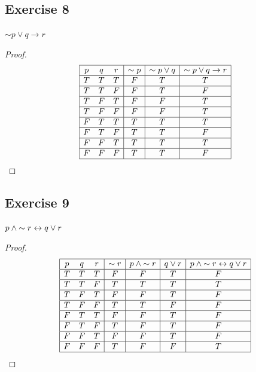 \documentclass[14pt]{extarticle}
\begin{document}
\subsection{Exercise 8} ${\sim p} \vee q \to r$
\begin{proof} $$ \begin{array}{|ccc|c|c|c|} \hline p & q & r & {\sim p} & {\sim
p} \vee q & {\sim p} \vee q \to r \\ \hline T & T & T & F & T & T \\ \hline T &
T & F & F & T & F \\ \hline T & F & T & F & F & T \\ \hline T & F & F & F & F &
T \\ \hline F & T & T & T & T & T \\ \hline F & T & F & T & T & F \\ \hline F &
F & T & T & T & T \\ \hline F & F & F & T & T & F \\ \hline \end{array} $$
\end{proof}

\subsection{Exercise 9} $p \wedge {\sim r} \leftrightarrow q \vee r$
\begin{proof} $$ \begin{array}{|ccc|c|c|c|c|} \hline p & q & r & {\sim r} & p
\wedge {\sim r} & q \vee r & p \wedge {\sim r} \leftrightarrow q \vee r \\ \hline T & T & T
& F & F & T & F \\ \hline T & T & F & T & T & T & T \\ \hline T & F & T & F & F
& T & F \\ \hline T & F & F & T & T & F & F \\ \hline F & T & T & F & F & T & F
\\ \hline F & T & F & T & F & T & F \\ \hline F & F & T & F & F & T & F \\
\hline F & F & F & T & F & F & T \\ \hline \end{array} $$ \end{proof}
\end{document}
